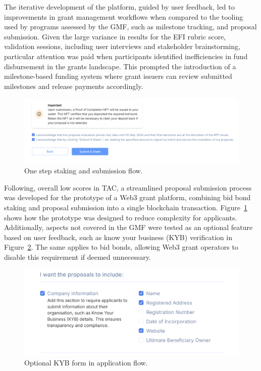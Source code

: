 \documentclass[conference]{IEEEtran}
\begin{document}
The iterative development of the platform, guided by user feedback, led to improvements in grant management workflows when compared to the tooling used by programs assessed by the GMF, such as milestone tracking, and proposal submission. Given the large variance in results for the EFI rubric score, validation sessions, including user interviews and stakeholder brainstorming, particular attention was paid when participants identified inefficiencies in fund disbursement in the grants landscape. This prompted the introduction of a milestone-based funding system where grant issuers can review submitted milestones and release payments accordingly.

\begin{figure}[htbp]
\centerline{\includegraphics[scale=0.24]{fig1.png}}
\caption{One step staking and submission flow.}
\label{fig:stake-submit}
\end{figure}

Following, overall low scores in TAC, a streamlined proposal submission process was developed for the prototype of a Web3 grant platform, combining bid bond staking and proposal submission into a single blockchain transaction. Figure~\ref{fig:stake-submit} shows how the prototype was designed to reduce complexity for applicants. Additionally, aspects not covered in the GMF were tested as an optional feature based on user feedback, such as know your business (KYB) verification in Figure~\ref{fig:kyb-optional}. The same applies to bid bonds, allowing Web3 grant operators to disable this requirement if deemed unnecessary.

\begin{figure}[htbp]
\centerline{\includegraphics[scale=0.4]{fig2.png}}
\caption{Optional KYB form in application flow.}
\label{fig:kyb-optional}
\end{figure}
\end{document}
